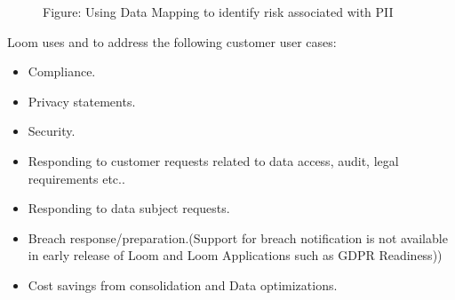 \documentclass[letterpaper,10pt,english]{sphinxmanual}
\begin{document}
\begin{figure}[htbp]
\centering
\capstart

\noindent{}
\caption{Figure: Using Data Mapping to identify risk associated with PII}\label{\detokenize{mcdmp_concepts:id22}}\end{figure}

Loom uses {\hyperref[\detokenize{mcdmp_concepts:term-data-inv}]{}} and {\hyperref[\detokenize{mcdmp_concepts:term-data-map}]{}} to address the following customer user cases:
\begin{itemize}
\item {} 
Compliance.

\item {} 
Privacy statements.

\item {} 
Security.

\item {} 
Responding to customer requests related to data access, audit, legal requirements etc..

\item {} 
Responding to data subject requests.

\item {} 
Breach response/preparation.(Support for breach notification is not available in early release of Loom and Loom Applications such as GDPR Readiness))

\item {} 
Cost savings from consolidation and Data optimizations.

\end{itemize}



\renewcommand{\indexname}{Index}
\printindex
\end{document}

